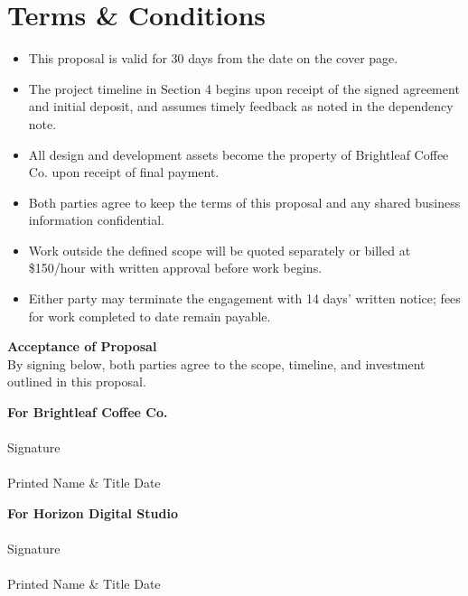 \section{Terms \& Conditions}

\begin{itemize}
  \item This proposal is valid for 30 days from the date on the cover page.
  \item The project timeline in Section 4 begins upon receipt of the signed agreement and initial
        deposit, and assumes timely feedback as noted in the dependency note.
  \item All design and development assets become the property of Brightleaf Coffee Co. upon
        receipt of final payment.
  \item Both parties agree to keep the terms of this proposal and any shared business information
        confidential.
  \item Work outside the defined scope will be quoted separately or billed at \$150/hour with
        written approval before work begins.
  \item Either party may terminate the engagement with 14 days' written notice; fees for work
        completed to date remain payable.
\end{itemize}

\vfill

\begin{tcolorbox}[colback=lightbg, colframe=accent, boxrule=0.6pt, arc=2pt, left=14pt, right=14pt, top=10pt, bottom=10pt]
  {\large\bfseries\color{accent} Acceptance of Proposal}\\[4pt]
  {\small\color{softgray} By signing below, both parties agree to the scope, timeline, and
  investment outlined in this proposal.}

  \vspace{1.4em}
  \noindent
  \begin{minipage}[t]{0.48\linewidth}
    \textbf{\color{accent}For Brightleaf Coffee Co.}\\[1.6em]
    \makebox[\linewidth]{\hrulefill}\\
    {\small\color{softgray}Signature}\\[1.0em]
    \makebox[\linewidth]{\hrulefill}\\
    {\small\color{softgray}Printed Name \& Title \quad\quad Date}
  \end{minipage}\hfill
  \begin{minipage}[t]{0.48\linewidth}
    \textbf{\color{accent}For Horizon Digital Studio}\\[1.6em]
    \makebox[\linewidth]{\hrulefill}\\
    {\small\color{softgray}Signature}\\[1.0em]
    \makebox[\linewidth]{\hrulefill}\\
    {\small\color{softgray}Printed Name \& Title \quad\quad Date}
  \end{minipage}
\end{tcolorbox}
